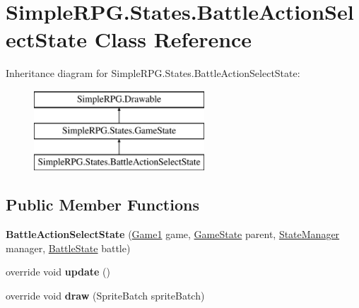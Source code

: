 \hypertarget{class_simple_r_p_g_1_1_states_1_1_battle_action_select_state}{\section{Simple\+R\+P\+G.\+States.\+Battle\+Action\+Select\+State Class Reference}
\label{class_simple_r_p_g_1_1_states_1_1_battle_action_select_state}
}
Inheritance diagram for Simple\+R\+P\+G.\+States.\+Battle\+Action\+Select\+State\+:\begin{figure}[H]
\begin{center}
\leavevmode
\includegraphics[height=3.000000cm]{class_simple_r_p_g_1_1_states_1_1_battle_action_select_state}
\end{center}
\end{figure}
\subsection*{Public Member Functions}
\begin{DoxyCompactItemize}
\item 
\hypertarget{class_simple_r_p_g_1_1_states_1_1_battle_action_select_state_aaa0f9b76c6f824efd3683ce6dccdcde6}{{\bfseries Battle\+Action\+Select\+State} (\hyperlink{class_simple_r_p_g_1_1_game1}{Game1} game, \hyperlink{class_simple_r_p_g_1_1_states_1_1_game_state}{Game\+State} parent, \hyperlink{class_simple_r_p_g_1_1_states_1_1_state_manager}{State\+Manager} manager, \hyperlink{class_simple_r_p_g_1_1_states_1_1_battle_state}{Battle\+State} battle)}\label{class_simple_r_p_g_1_1_states_1_1_battle_action_select_state_aaa0f9b76c6f824efd3683ce6dccdcde6}

\item 
\hypertarget{class_simple_r_p_g_1_1_states_1_1_battle_action_select_state_a1c5d4bbcde130994d834b345cdf1210a}{override void {\bfseries update} ()}\label{class_simple_r_p_g_1_1_states_1_1_battle_action_select_state_a1c5d4bbcde130994d834b345cdf1210a}

\item 
\hypertarget{class_simple_r_p_g_1_1_states_1_1_battle_action_select_state_a4e73b93f17d6be64765870b3b50987d6}{override void {\bfseries draw} (Sprite\+Batch sprite\+Batch)}\label{class_simple_r_p_g_1_1_states_1_1_battle_action_select_state_a4e73b93f17d6be64765870b3b50987d6}

\end{DoxyCompactItemize}
